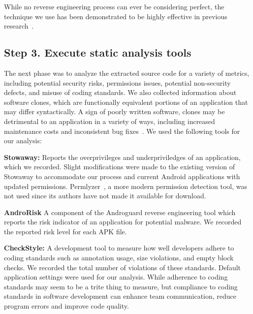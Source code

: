 
While no reverse engineering process can ever be considering perfect, the technique we use has been demonstrated to be highly effective in previous research~\cite{apvrille2012android,chawla2014transfiguring}.



\subsection{Step 3. Execute static analysis tools}
\label{sec: analysis}

The next phase was to analyze the extracted source code for a variety of metrics, including potential security risks, permissions issues, potential non-security defects, and misuse of coding standards. We also collected information about software clones, which are functionally equivalent portions of an application that may differ syntactically. A sign of poorly written software, clones may be detrimental to an application in a variety of ways, including increased maintenance costs and inconsistent bug fixes~\cite{Roy:2009:CEC:1530898.1531101}. We used the following tools for our analysis:

 \textbf{Stowaway:} Reports the overprivileges and underpriviledges of an application, which we recorded. Slight modifications were made to the existing version of Stowaway to accommodate our process and current Android applications with updated permissions. Permlyzer~\cite{6698893}, a more modern permission detection tool, was not used since its authors have not made it available for download.

 \textbf{AndroRisk} A component of the Androguard reverse engineering tool which reports the risk indicator of an application for potential malware. We recorded the reported risk level for each APK file.

 \textbf{CheckStyle:} A development tool to measure how well developers adhere to coding standards such as annotation usage, size violations, and empty block checks. We recorded the total number of violations of these standards. Default application settings were used for our analysis. While adherence to coding standards may seem to be a trite thing to measure, but compliance to coding standards in software development can enhance team communication, reduce program errors and improve code quality.


